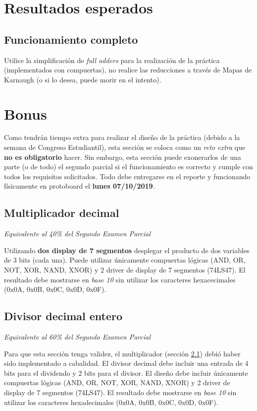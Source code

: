 \section{Resultados esperados}
\subsection{Funcionamiento completo}
Utilice la simplificación de \emph{full adders} para la realización de la práctica (implementados con compuertas), no realice las reducciones a través de Mapas de Karnaugh (o si lo desea, puede
morir en el intento).

\pagebreak

\section{Bonus}
Como tendrán tiempo extra para realizar el diseño de la práctica (debido a la semana de Congreso Estudiantil), esta sección se coloca como un \emph{reto extra} 
que \textbf{no es obligatorio} hacer. Sin embargo, esta sección puede exonerarlos de una parte (o de todo) el segundo parcial si el funcionamiento es correcto
y cumple con todos los requisitos solicitados. Todo debe entregarse en el reporte y funcionando físicamente en protoboard el \textbf{lunes 07/10/2019}.

\subsection{Multiplicador decimal} \label{sec:Multiplicador}
\emph{Equivalente al 40\% del Segundo Examen Parcial}
\vspace{14pt}

Utilizando \textbf{dos display de 7 segmentos} desplegar el producto de dos variables de 3 bits (cada una). Puede utilizar
únicamente compuertas lógicas (AND, OR, NOT, XOR, NAND, XNOR) y 2 driver de display de 7 segmentos (74LS47). El resultado debe mostrarse en \emph{base 10}
sin utilizar los caracteres hexacecimales (0x0A, 0x0B, 0x0C, 0x0D, 0x0F).

\subsection{Divisor decimal entero}
\emph{Equivalente al 60\% del Segundo Examen Parcial}
\vspace{14pt}

Para que esta sección tenga validez, el multiplicador (sección \ref{sec:Multiplicador}) debió haber sido implementado a cabalidad. El divisor decimal debe incluir 
una entrada de 4 bits para el dividendo y 2 bits para el divisor. El diseño debe incluir únicamente compuertas lógicas (AND, OR, NOT, XOR, NAND, XNOR) y
2 driver de display de 7 segmentos (74LS47). El resultado debe mostrarse en \emph{base 10} sin utilizar los caracteres hexadecimales (0x0A, 0x0B, 0x0C, 0x0D, 0x0F).
